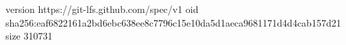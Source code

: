version https://git-lfs.github.com/spec/v1
oid sha256:eaf6822161a2bd6ebc638ee8c7796c15e10da5d1aeca9681171d4d4cab157d21
size 310731
